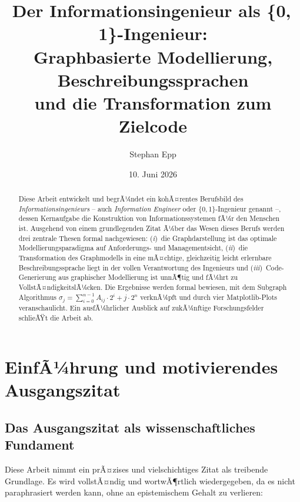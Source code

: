 ﻿\documentclass[a4paper,12pt]{article}
\title{\textbf{Der Informationsingenieur als \{0,\,1\}-Ingenieur:\\
Graphbasierte Modellierung, Beschreibungssprachen\\
und die Transformation zum Zielcode}}
\author{Stephan Epp}
\date{10. Juni 2026}
\theoremstyle{definition}
\begin{document}
\sloppy

\maketitle

\begin{abstract}
Diese Arbeit entwickelt und begrÃ¼ndet ein kohÃ¤rentes Berufsbild des \emph{Informationsingenieurs}
-- auch \emph{Information Engineer} oder \{0,\,1\}-Ingenieur genannt --,
dessen Kernaufgabe die Konstruktion von Informationssystemen fÃ¼r den Menschen ist.
Ausgehend von einem grundlegenden Zitat Ã¼ber das Wesen dieses Berufs werden
drei zentrale Thesen formal nachgewiesen:
(\emph{i})~die Graphdarstellung ist das optimale Modellierungsparadigma auf Anforderungs- und
Managementsicht,
(\emph{ii})~die Transformation des Graphmodells in eine mÃ¤chtige, gleichzeitig leicht
erlernbare Beschreibungssprache liegt in der vollen Verantwortung des Ingenieurs und
(\emph{iii})~Code-Generierung aus graphischer Modellierung ist unnÃ¶tig und fÃ¼hrt zu
VollstÃ¤ndigkeitslÃ¼cken.
Die Ergebnisse werden formal bewiesen, mit dem Subgraph Algorithmus
$\sigma_j = \sum_{i=0}^{n-1} A_{ij} \cdot 2^i + j \cdot 2^n$ verknÃ¼pft und durch vier
Matplotlib-Plots veranschaulicht. Ein ausfÃ¼hrlicher Ausblick auf zukÃ¼nftige Forschungsfelder
schlieÃŸt die Arbeit ab.
\end{abstract}

\tableofcontents
\newpage

\section{EinfÃ¼hrung und motivierendes Ausgangszitat}

\subsection{Das Ausgangszitat als wissenschaftliches Fundament}

Diese Arbeit nimmt ein prÃ¤zises und vielschichtiges Zitat als treibende Grundlage. Es wird
vollstÃ¤ndig und wortwÃ¶rtlich wiedergegeben, da es nicht paraphrasiert werden kann, ohne an
epistemischem Gehalt zu verlieren:
\end{document}
